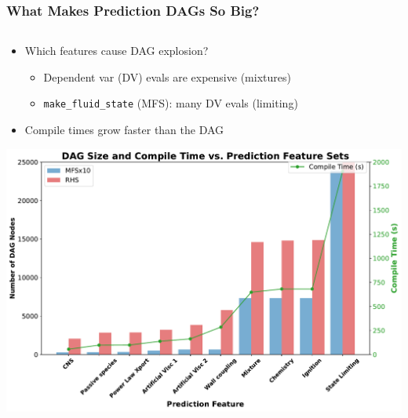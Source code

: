 \begin{frame}\frametitle{What Makes Prediction DAGs So Big?}
\begin{columns}[T, onlytextwidth] %
    \begin{column}{0.48\textwidth}
        \begin{itemize}
          \item Which features cause DAG explosion?
          \begin{itemize}
          \item Dependent var (DV) evals are expensive (mixtures)
          \item \texttt{make\_fluid\_state} (MFS): many DV evals (limiting)
          \end{itemize}
          \item Compile times grow faster than the DAG
        \end{itemize}
        \vspace{10pt}
        \centering
        \includegraphics[width=\textwidth]{Figures/mtc/prediction_features_dag.pdf}
    \end{column}


\end{columns}
\end{frame}
